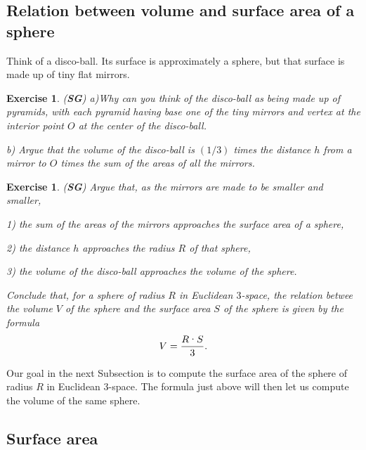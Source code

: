 \documentclass{article}%
\newtheorem{exercise}[theorem]{Exercise}
\begin{document}
\subsection{Relation between volume and surface area of a sphere}

Think of a disco-ball. Its surface is approximately a sphere, but that surface
is made up of tiny flat mirrors.

\begin{exercise}
(\textbf{SG}) a)Why can you think of the disco-ball as being made up of
pyramids, with each pyramid having base one of the tiny mirrors and vertex at
the interior point $O$ at the center of the disco-ball.

b) Argue that the volume of the disco-ball is $\left(  1/3\right)  $ times the
distance $h$ from a mirror to $O$ times the sum of the areas of all the mirrors.
\end{exercise}

\begin{exercise}
(\textbf{SG}) Argue that, as the mirrors are made to be smaller and smaller,

1) the sum of the areas of the mirrors approaches the surface area of a sphere,

2) the distance $h$ approaches the radius $R$ of that sphere,

3) the volume of the disco-ball approaches the volume of the sphere.

Conclude that, for a sphere of radius $R$ in Euclidean $3$-space, the relation
betwee the volume $V$ of the sphere and the surface area $S$ of the sphere is
given by the formula%
\[
V=\frac{R\text{\textperiodcentered}S}{3}.
\]

\end{exercise}

Our goal in the next Subsection is to compute the surface area of the sphere
of radius $R$ in Euclidean $3$-space. The formula just above will then let us
compute the volume of the same sphere.\pagebreak

\subsection{Surface area}
\end{document}
